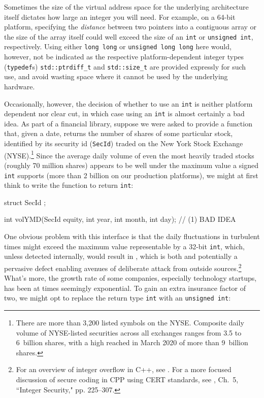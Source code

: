 Sometimes the size of the virtual address space for the
underlying architecture itself dictates how large an integer you will
need. For example, on a 64-bit platform, specifying the \emph{distance} between two pointers
into a contiguous array or the size of the array itself could well exceed the size of an \lstinline!int! or
\lstinline!unsigned!~\lstinline!int!, respectively. Using either
\lstinline!long!~\lstinline!long! or
\lstinline!unsigned!~\lstinline!long!~\lstinline!long! here would, however, not
be indicated as the respective platform-dependent integer types
(\lstinline!typedef!s) \lstinline!std::ptrdiff_t! and \lstinline!std::size_t!
are provided expressly for such use, and avoid wasting space where it
cannot be used by the underlying hardware.

Occasionally, however, the decision of whether to use an \lstinline!int! is
neither platform dependent nor clear cut, in which case using an
\lstinline!int! is almost certainly a bad idea. As part of a financial
library, suppose we were asked to provide a function that, given a date,
returns the number of shares of some particular stock, identified by its
security id (\lstinline!SecId!) traded on the New York Stock Exchange
(NYSE).\footnote{There are more than 3,200 listed symbols on the NYSE. Composite daily volume of NYSE-listed securities across all exchanges  ranges from 3.5 to 6~billion shares, with a high reached in March 2020 of more than 9~billion shares.} Since the average daily volume of even the most heavily traded stocks (roughly 70 million shares) appears to
be well under the maximum value a signed \lstinline!int! supports (more
than 2 billion on our production platforms), we might at first think to write the function
to return \lstinline!int!:

\begin{emcppshiddenlisting}[emcppsbatch={e1,e2,e3,e4,e5,e6}]
struct SecId {};
\end{emcppshiddenlisting}
\begin{emcppslisting}[emcppsbatch=e1]
int volYMD(SecId equity, int year, int month, int day);  // (1) BAD IDEA
\end{emcppslisting}

\noindent One obvious problem with this interface is that the daily fluctuations
in turbulent times might exceed the maximum value representable by a
32-bit \lstinline!int!, which, unless detected internally, would result in
, which is both  and potentially a pervasive defect enabling avenues of deliberate attack from outside sources.{\cprotect\footnote{For an overview of integer overflow in C++, see \cite{ballman}. For a more focused discussion of secure coding in CPP using CERT standards, see \cite{seacord13}, Ch.~5, ``Integer Security," pp. 225--307.}} What's more, the growth rate of some companies,
especially technology startups, has
been at times seemingly exponential. To gain an extra
insurance factor of two, we might opt to replace the return type
\lstinline!int! with an \lstinline!unsigned!~\lstinline!int!:

